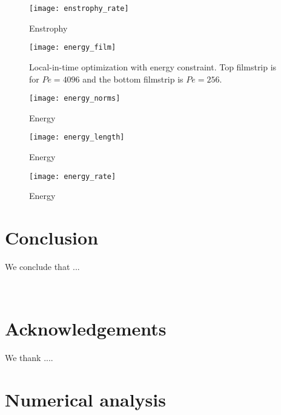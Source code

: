 \documentclass{jfm}
\newcommand{\ddt}[1]{\frac{d #1}{dt}}
\newcommand{\hmone}[1]{\|\nabla^{-1} #1\|_{L^{2}}}
\newcommand{\ltwo}[1]{\|#1\|_{L^{2}}}
\newcommand{\hone}[1]{\| \nabla #1\|_{L^{2}}}
\renewcommand{\vec}[1]{\mathbf{#1}}
\newcommand{\linf}[1]{\| #1 \|_{L^{\infty}}}
\newcommand{\tavg}[1]{\langle  #1 \rangle}
\begin{document}
\begin{figure}
\centering
\texttt{[image: enstrophy\_rate]}
\caption{Enstrophy}
\end{figure}


\begin{figure}
\texttt{[image: energy\_film]}
\caption{Local-in-time optimization with energy constraint. Top filmstrip is for $Pe = 4096$ and the bottom filmstrip is $Pe=256$.}
\end{figure}

\begin{figure}
\texttt{[image: energy\_norms]}
\caption{Energy}
\end{figure}

\begin{figure}
\texttt{[image: energy\_length]}
\caption{Energy}
\end{figure}

\begin{figure}
\centering
\texttt{[image: energy\_rate]}
\caption{Energy}
\end{figure}






\section{Conclusion}

We conclude that ...

\
\section*{Acknowledgements}

We thank ....

\appendix
\section{Numerical analysis}
\label{sec:num_analysis}


\end{document}
